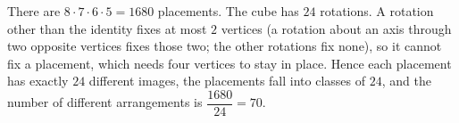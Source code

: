 There are $8\cdot7\cdot6\cdot5=1680$ placements. The cube has $24$ rotations. A rotation other than the identity fixes at most $2$ vertices (a rotation about an axis through two opposite vertices fixes those two; the other rotations fix none), so it cannot fix a placement, which needs four vertices to stay in place. Hence each placement has exactly $24$ different images, the placements fall into classes of $24$, and the number of different arrangements is $\dfrac{1680}{24}=\boxed{70}$.
